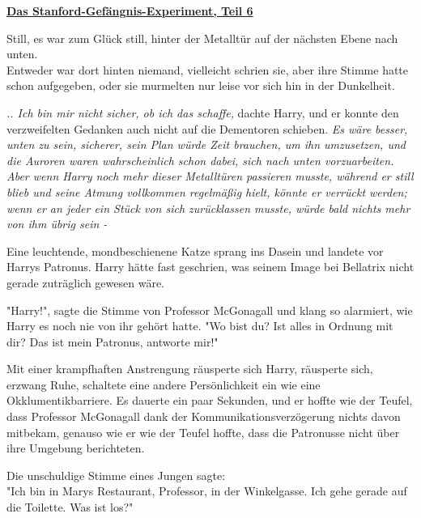 

\hypertarget{das-stanford-gefuxe4ngnis-experiment-teil-6}{%

\textbf{\uline{Das Stanford-Gefängnis-Experiment, Teil 6}}

Still, es war zum Glück still, hinter der Metalltür auf der nächsten Ebene nach unten.\\ Entweder war dort hinten niemand, vielleicht schrien sie, aber ihre Stimme hatte schon aufgegeben, oder sie murmelten nur leise vor sich hin in der Dunkelheit.

\emph{.. Ich bin mir nicht sicher, ob ich das schaffe,} dachte Harry, und er konnte den verzweifelten Gedanken auch nicht auf die Dementoren schieben. \emph{Es wäre besser, unten zu sein, sicherer, sein Plan würde Zeit brauchen, um ihn umzusetzen, und die Auroren waren wahrscheinlich schon dabei, sich nach unten vorzuarbeiten. Aber wenn Harry noch mehr dieser Metalltüren passieren musste, während er still blieb und seine Atmung vollkommen regelmäßig hielt, könnte er verrückt werden; wenn er an jeder ein Stück von sich zurücklassen musste, würde bald nichts mehr von ihm übrig sein -}

Eine leuchtende, mondbeschienene Katze sprang ins Dasein und landete vor Harrys Patronus. Harry hätte fast geschrien, was seinem Image bei Bellatrix nicht gerade zuträglich gewesen wäre.

"Harry!", sagte die Stimme von Professor McGonagall und klang so alarmiert, wie Harry es noch nie von ihr gehört hatte. "Wo bist du? Ist alles in Ordnung mit dir? Das ist mein Patronus, antworte mir!"

Mit einer krampfhaften Anstrengung räusperte sich Harry, räusperte sich, erzwang Ruhe, schaltete eine andere Persönlichkeit ein wie eine Okklumentikbarriere. Es dauerte ein paar Sekunden, und er hoffte wie der Teufel, dass Professor McGonagall dank der Kommunikationsverzögerung nichts davon mitbekam, genauso wie er wie der Teufel hoffte, dass die Patronusse nicht über ihre Umgebung berichteten.

Die unschuldige Stimme eines Jungen sagte:\\ "Ich bin in Marys Restaurant, Professor, in der Winkelgasse. Ich gehe gerade auf die Toilette. Was ist los?"

}
